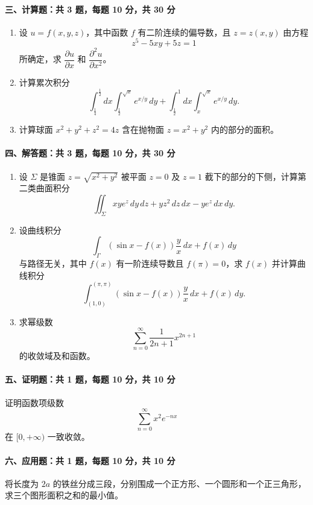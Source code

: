 \paragraph*{三、计算题：共 3 题，每题 10 分，共 30 分}
\begin{enumerate}
  \item 设 $u=f(x,y,z)$，其中函数 $f$ 有二阶连续的偏导数，且 $z=z(x,y)$ 由方程
  \[
    z^5-5xy+5z=1
  \]
  所确定，求 $\dfrac{\partial u}{\partial x}$ 和 $\dfrac{\partial^2u}{\partial x^2}$。

  \item 计算累次积分
  \[
    \int_{\frac14}^{\frac12} dx\int_{\frac12}^{\sqrt{x}} e^{x/y}\,dy
    +\int_{\frac12}^{1} dx\int_x^{\sqrt{x}} e^{x/y}\,dy.
  \]

  \item 计算球面 $x^2+y^2+z^2=4z$ 含在抛物面 $z=x^2+y^2$ 内的部分的面积。
\end{enumerate}

\paragraph*{四、解答题：共 3 题，每题 10 分，共 30 分}
\begin{enumerate}
  \item 设 $\Sigma$ 是锥面 $z=\sqrt{x^2+y^2}$ 被平面 $z=0$ 及 $z=1$ 截下的部分的下侧，计算第二类曲面积分
  \[
    \iint_{\Sigma} xye^z\,dy\,dz+yz^2\,dz\,dx-ye^z\,dx\,dy.
  \]

  \item 设曲线积分
  \[
    \int_{\Gamma}\left(\sin x-f(x)\right)\frac{y}{x}\,dx+f(x)\,dy
  \]
  与路径无关，其中 $f(x)$ 有一阶连续导数且 $f(\pi)=0$，求 $f(x)$ 并计算曲线积分
  \[
    \int_{(1,0)}^{(\pi,\pi)}
    \left(\sin x-f(x)\right)\frac{y}{x}\,dx+f(x)\,dy.
  \]

  \item 求幂级数
  \[
    \sum_{n=0}^{\infty}\frac{1}{2n+1}x^{2n+1}
  \]
  的收敛域及和函数。
\end{enumerate}

\paragraph*{五、证明题：共 1 题，每题 10 分，共 10 分}
证明函数项级数
\[
  \sum_{n=0}^{\infty}x^2e^{-nx}
\]
在 $[0,+\infty)$ 一致收敛。

\paragraph*{六、应用题：共 1 题，每题 10 分，共 10 分}
将长度为 $2a$ 的铁丝分成三段，分别围成一个正方形、一个圆形和一个正三角形，求三个图形面积之和的最小值。

